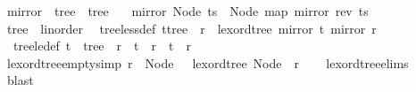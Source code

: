 \begin{isabellebody}
\isanewline
{}\isamarkupfalse%
\ mirror\ {\isacharcolon}{\kern0pt}{\isacharcolon}{\kern0pt}\ {\isachardoublequoteopen}tree\ {\isasymRightarrow}\ tree{\isachardoublequoteclose}\ \isanewline
\ \ {\isachardoublequoteopen}mirror\ {\isacharparenleft}{\kern0pt}Node\ ts{\isacharparenright}{\kern0pt}\ {\isacharequal}{\kern0pt}\ Node\ {\isacharparenleft}{\kern0pt}map\ mirror\ {\isacharparenleft}{\kern0pt}rev\ ts{\isacharparenright}{\kern0pt}{\isacharparenright}{\kern0pt}{\isachardoublequoteclose}\isanewline
\isanewline
{}\isamarkupfalse%
\ tree\ {\isacharcolon}{\kern0pt}{\isacharcolon}{\kern0pt}\ linorder\isanewline
{}\isanewline
\isanewline
{}\isamarkupfalse%
\isanewline
\ \ tree{\isacharunderscore}{\kern0pt}less{\isacharunderscore}{\kern0pt}def{\isacharcolon}{\kern0pt}\ {\isachardoublequoteopen}{\isacharparenleft}{\kern0pt}t{\isacharcolon}{\kern0pt}{\isacharcolon}{\kern0pt}tree{\isacharparenright}{\kern0pt}\ {\isacharless}{\kern0pt}\ r\ {\isasymlongleftrightarrow}\ lexord{\isacharunderscore}{\kern0pt}tree\ {\isacharparenleft}{\kern0pt}mirror\ t{\isacharparenright}{\kern0pt}\ {\isacharparenleft}{\kern0pt}mirror\ r{\isacharparenright}{\kern0pt}{\isachardoublequoteclose}\isanewline
\isanewline
{}\isamarkupfalse%
\isanewline
\ \ tree{\isacharunderscore}{\kern0pt}le{\isacharunderscore}{\kern0pt}def{\isacharcolon}{\kern0pt}\ {\isachardoublequoteopen}{\isacharparenleft}{\kern0pt}t\ {\isacharcolon}{\kern0pt}{\isacharcolon}{\kern0pt}\ tree{\isacharparenright}{\kern0pt}\ {\isasymle}\ r\ {\isasymlongleftrightarrow}\ t\ {\isacharless}{\kern0pt}\ r\ {\isasymor}\ t\ {\isacharequal}{\kern0pt}\ r{\isachardoublequoteclose}\ \ \isanewline
\isanewline
{}\isamarkupfalse%
\ lexord{\isacharunderscore}{\kern0pt}tree{\isacharunderscore}{\kern0pt}empty{}{\isacharbrackleft}{\kern0pt}simp{\isacharbrackright}{\kern0pt}{\isacharcolon}{\kern0pt}\ {\isachardoublequoteopen}r\ {\isasymnoteq}\ Node\ {\isacharbrackleft}{\kern0pt}{\isacharbrackright}{\kern0pt}\ {\isasymLongrightarrow}\ lexord{\isacharunderscore}{\kern0pt}tree\ {\isacharparenleft}{\kern0pt}Node\ {\isacharbrackleft}{\kern0pt}{\isacharbrackright}{\kern0pt}{\isacharparenright}{\kern0pt}\ r{\isachardoublequoteclose}\isanewline
%
\isadelimproof
\ \ %
\endisadelimproof
%
\isatagproof
{}\isamarkupfalse%
\ lexord{\isacharunderscore}{\kern0pt}tree{\isachardot}{\kern0pt}elims{\isacharparenleft}{\kern0pt}{}{\isacharparenright}{\kern0pt}\ \isamarkupfalse%
\ blast%

\end{isabellebody}
